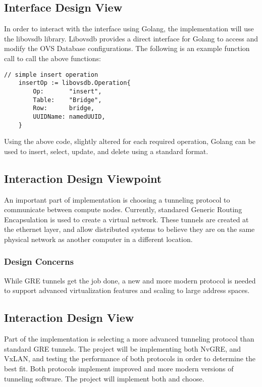\documentclass[10pt,onecolumn,journal,draftclsnofoot]{IEEEtran}
\begin{document}
\subsection{Interface Design View}
In order to interact with the interface using Golang, the implementation will
use the libovsdb library\cite{libovsdb}. Libovsdb provides a direct interface
for Golang to access and modify the OVS Database configurations. The following
is an example function call to call the above functions:\cite{gosample}\\

\begin{lstlisting}[caption=Example insert operation in the OVS Database]
	// simple insert operation
	insertOp := libovsdb.Operation{
		Op:       "insert",
		Table:    "Bridge",
		Row:      bridge,
		UUIDName: namedUUID,
	}
\end{lstlisting}

Using the above code, slightly altered for each required operation, Golang can
be used to insert, select, update, and delete using a standard format.
\subsection{Interaction Design Viewpoint}
An important part of implementation is choosing a tunneling protocol to
communicate between compute nodes. Currently, standared Generic Routing
Encapsulation is used to create a virtual network. These tunnels are created at
the ethernet layer, and allow distributed systems to believe they are on the
same physical network as another computer in a different location.

\subsubsection{Design Concerns}
While GRE tunnels get the job done, a new and more modern protocol is needed to
support advanced virtualization features and scaling to large address spaces.

\subsection{Interaction Design View}
Part of the implementation is selecting a more advanced tunneling protocol than
standard GRE tunnels. The project will be implementing both NvGRE, and VxLAN,
and testing the performance of both protocols in order to determine the best
fit. Both protocols implement improved and more modern versions of tunneling
software. The project will implement both and choose.
\end{document}
